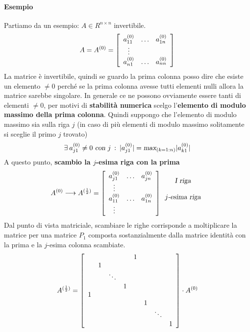 \documentclass[10pt]{book}
\begin{document}
\paragraph{Esempio} Partiamo da un esempio: $A \in R^{n \times n}$ invertibile.
$$A = A^{(0)} = \left[
\begin{array}{c c c}
a_{11}^{(0)} & \ldots & a_{1n}^{(0)} \\
\vdots \\
a_{n1}^{(0)} & \ldots & a_{nn}^{(0)}
\end{array}
\right]$$
La matrice è invertibile, quindi se guardo la prima colonna posso dire che esiste un elemento $\neq 0$ perché se la prima colonna avesse tutti elementi nulli allora la matrice sarebbe singolare. In generale ce ne possono ovviamente essere tanti di elementi $\neq 0$, per motivi di \textbf{stabilità numerica} scelgo l'\textbf{elemento di modulo massimo della prima colonna}. Quindi suppongo che l'elemento di modulo massimo sia sulla riga $j$ (in caso di più elementi di modulo massimo solitamente si sceglie il primo $j$ trovato)
$$\exists\: a_{j1}^{(0)} \neq 0\textsl{ con }j\: : \:|a_{j1}^{(0)}| = \textsl{max}_{(k = 1:n)}|a_{k1}^{(0)}|$$
A questo punto, \textbf{scambio la $j$-esima riga con la prima}
$$A^{(0)} \longrightarrow A^{(\frac{1}{2})} = \left[
\begin{array}{c c c}
a_{j1}^{(0)} & \ldots & a_{jn}^{(0)} \\
\vdots \\
a_{11}^{(0)} & \ldots & a_{1n}^{(0)} \\
\vdots
\end{array}
\right]
\begin{array}{c}
\textsl{I riga}\\
\\
j\textsl{-esima riga}\\
\\
\end{array}$$
Dal punto di vista matriciale, scambiare le righe corrisponde a moltiplicare la matrice per una matrice $P_1$ composta sostanzialmente dalla matrice identità con la prima e la $j$-esima colonna scambiate.
$$A^{(\frac{1}{2})} = \left[
\begin{array}{c c c c c c c c}
 & & & & 1 & & & \\
 & 1 & & & & & & \\
 & & \ddots\\
 & & & 1\\
 1 \\
 & & & & & 1 \\
 & & & & & & \ddots\\
 & & & & & & & 1
\end{array}
\right]\cdot A^{(0)}$$
\end{document}
